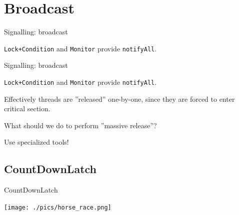 \section{Broadcast}
\showTOC

\begin{frame}[t]{Signalling: broadcast}

\texttt{Lock+Condition} and \texttt{Monitor} provide \texttt{notifyAll}.
\end{frame}


\begin{frame}[t,noframenumbering]{Signalling: broadcast}

\texttt{Lock+Condition} and \texttt{Monitor} provide \texttt{notifyAll}.

Effectively threads are ''released'' one-by-one, since they are forced to enter critical section.

\pause
What should we do to perform ''massive release''?

\pause
Use specialized tools!
\end{frame}


\subsection{CountDownLatch}
\showTOCSub

\begin{frame}[fragile]{CountDownLatch}

\begin{center}
\texttt{[image: ./pics/horse\_race.png]}
\end{center}

\end{frame}


